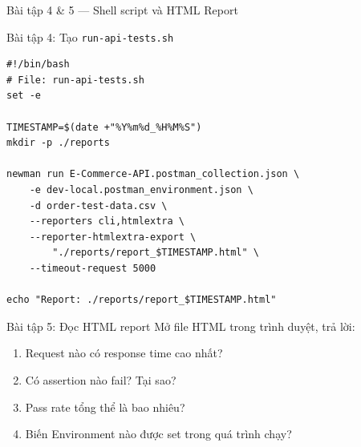 \documentclass[aspectratio=169,10pt]{beamer}
\begin{document}
\begin{frame}[fragile]{Bài tập 4 \& 5 --- Shell script và HTML Report}
  \begin{block}{Bài tập 4: Tạo \texttt{run-api-tests.sh}}
\begin{lstlisting}[style=bash]
#!/bin/bash
# File: run-api-tests.sh
set -e

TIMESTAMP=$(date +"%Y%m%d_%H%M%S")
mkdir -p ./reports

newman run E-Commerce-API.postman_collection.json \
    -e dev-local.postman_environment.json \
    -d order-test-data.csv \
    --reporters cli,htmlextra \
    --reporter-htmlextra-export \
        "./reports/report_$TIMESTAMP.html" \
    --timeout-request 5000

echo "Report: ./reports/report_$TIMESTAMP.html"
\end{lstlisting}
  \end{block}

  \begin{block}{Bài tập 5: Đọc HTML report}
    Mở file HTML trong trình duyệt, trả lời:
    \begin{enumerate}
      \item Request nào có response time cao nhất?
      \item Có assertion nào fail? Tại sao?
      \item Pass rate tổng thể là bao nhiêu?
      \item Biến Environment nào được set trong quá trình chạy?
    \end{enumerate}
  \end{block}
\end{frame}
\end{document}
